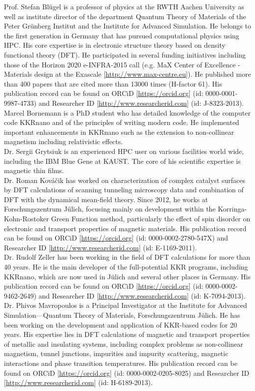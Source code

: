 \documentclass [a4paper, 12pt]{article}
\begin{document}
Prof. Stefan Bl{\"u}gel is a professor of physics at the RWTH Aachen University as well as 
institute director of the department Quantum Theory of Materials of the 
Peter Gr\"unberg Institut and the Institute for Advanced Simulation. 
He belongs to the first generation in Germany that has pursued computational physics 
using HPC. His core expertise is in electronic structure 
theory based on density functional theory (DFT).
He participated in several funding initiatives including those of the 
Horizon 2020 e-INFRA-2015 call
(e.g. MaX Center of Excellence - Materials design at the Exascale [\url{http://www.max-centre.eu}]).
He published more than 400 papers that are cited more than 13000 times (H-factor 61).
His publication record can be found on ORCiD [\url{https://orcid.org}] (id: 0000-0001-9987-4733) 
and Researcher ID
[\url{http://www.researcherid.com}] (id: J-8323-2013).
\\
Marcel Bornemann is a PhD student who has
detailed knowledge of the computer code KKRnano and of the principles of writing modern code. 
He implemented important enhancements in KKRnano such as the extension to non-collinear
magnetism including relativistic effects.
\\
Dr. Sergii Grytsiuk is
an experienced HPC user on various facilities world wide, including the IBM Blue Gene at KAUST. 
The core of his scientific expertise is magnetic thin films. 
\\
Dr. Roman Kováčik has worked on characterization of complex catalyst surfaces 
by DFT calculations of scanning tunneling 
microscopy data and combination of DFT with the dynamical mean-field 
theory. Since 2012, he works at Forschungszentrum J\"ulich, focusing mainly on
development within the Korringa-Kohn-Rostoker Green Function method, 
particularly the effect of spin disorder on electronic and transport properties 
of magnetic materials. His publication record can be found on ORCiD 
[\url{https://orcid.org}] (id: 0000-0002-2780-547X) and Researcher ID 
[\url{http://www.researcherid.com}] (id: E-1169-2011).
\\
Dr. Rudolf Zeller has been working in the field of DFT calculations for more than 40 years. 
He is the main developer of the full-potential KKR programs, including KKRnano, 
which are now used in J{\"u}lich and several other places in Germany.
His publication record can be found on ORCiD [\url{https://orcid.org}] (id: 0000-0002-9462-2649) 
and Researcher ID
[\url{http://www.researcherid.com}] (id: K-7094-2013).
\\
Dr. Phivos Mavropoulos is a Principal Investigator at the Institute for Advanced Simulation—Quantum
Theory of Materials, Forschungszentrum J\"ulich.
He has been working on the development and application of KKR-based codes for 20 years. 
His expertise lies in DFT calculations of magnetic and transport
properties of metallic and insulating systems, including complex problems as non-collinear magnetism, 
tunnel junctions, impurities and impurity scattering, magnetic interactions and phase transition temperatures.
His publication record can be found on ORCiD [\url{https://orcid.org}] (id: 0000-0002-0205-8025) 
and Researcher ID
[\url{http://www.researcherid.com}] (id: H-6189-2013).
\end{document}
